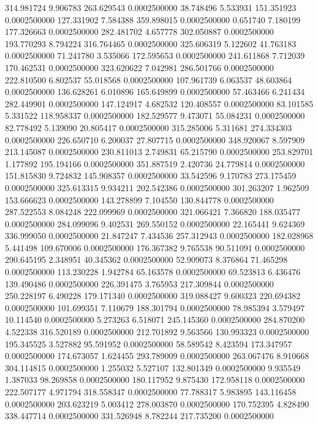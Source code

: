314.981724 9.906783 263.629543 0.0002500000
38.748496 5.533931 151.351923 0.0002500000
127.331902 7.584388 359.898015 0.0002500000
0.651740 7.180199 177.326663 0.0002500000
282.481702 4.657778 302.050887 0.0002500000
193.770293 8.794224 316.764465 0.0002500000
325.606319 5.122602 41.763183 0.0002500000
71.241780 3.535066 172.595653 0.0002500000
241.611868 7.712039 170.462531 0.0002500000
323.620622 7.042981 286.501766 0.0002500000
222.810500 6.802537 55.018568 0.0002500000
107.961739 6.063537 48.603864 0.0002500000
136.628261 6.010896 165.649899 0.0002500000
57.463466 6.241434 282.449901 0.0002500000
147.124917 4.682532 120.408557 0.0002500000
83.101585 5.331522 118.958337 0.0002500000
182.529577 9.473071 55.084231 0.0002500000
82.778492 5.139090 20.805417 0.0002500000
315.285006 5.311681 274.334303 0.0002500000
226.650710 6.200037 27.807715 0.0002500000
348.920067 8.597909 213.145087 0.0002500000
230.811013 2.749831 65.215790 0.0002500000
253.829701 1.177892 195.194166 0.0002500000
351.887519 2.420736 24.779814 0.0002500000
151.815830 9.724832 145.908357 0.0002500000
33.542596 9.170783 273.175459 0.0002500000
325.613315 9.934211 202.542386 0.0002500000
301.263207 1.962509 153.666623 0.0002500000
143.278899 7.104550 130.844778 0.0002500000
287.522553 8.084248 222.099969 0.0002500000
321.066421 7.366820 188.035477 0.0002500000
284.099096 9.402531 269.550152 0.0002500000
22.165441 9.624369 336.999050 0.0002500000
21.847247 7.434536 257.312943 0.0002500000
182.028968 5.441498 109.670006 0.0002500000
176.367382 9.765538 90.511091 0.0002500000
290.645195 2.348951 40.345362 0.0002500000
52.909073 8.376864 71.465298 0.0002500000
113.230228 1.942784 65.163578 0.0002500000
69.523813 6.436476 139.490486 0.0002500000
226.391475 3.765953 217.309844 0.0002500000
250.228197 6.490228 179.171340 0.0002500000
319.088427 9.600323 220.694382 0.0002500000
101.699351 7.110679 188.301794 0.0002500000
78.985394 3.579497 10.114540 0.0002500000
5.273263 6.518071 245.145360 0.0002500000
284.870200 4.522338 316.520189 0.0002500000
212.701892 9.563566 130.993323 0.0002500000
195.345525 3.527882 95.591952 0.0002500000
58.589542 8.423594 173.347957 0.0002500000
174.673057 1.624455 293.789009 0.0002500000
263.067476 8.910668 304.114815 0.0002500000
1.255032 5.527107 132.801349 0.0002500000
9.935549 1.387033 98.269858 0.0002500000
180.117952 9.875430 172.958118 0.0002500000
222.507177 4.971794 318.558347 0.0002500000
77.788317 5.983895 143.116458 0.0002500000
203.623219 5.003412 278.003870 0.0002500000
170.752395 4.828490 338.447714 0.0002500000
331.526948 8.782244 217.735200 0.0002500000
